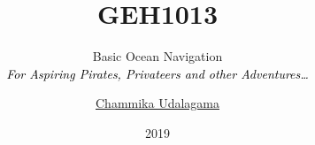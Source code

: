 

\renewcommand\howTitle[3]{
	\title[GEH1013]{\large \bfseries \color{black}GEH1013\\\medskip}
	\subtitle{{{\fontsize{30}{150}\selectfont #1}}\\\smallskip \textcolor{black}{\itshape \small #2}}
	\author[Chammika Udalagama]{\scriptsize \href{mailto:chammika@nus.edu.sg}{\textcolor{green!50!black}{Chammika Udalagama}}
	}
	\date{2019}

	\addtocounter{framenumber}{-3}
}





\howTitle{Basic Ocean Navigation}{For Aspiring Pirates, Privateers and other Adventures\ldots}{Guest Lecture}


%

{
	\begin{frame}
\end{frame}
}

